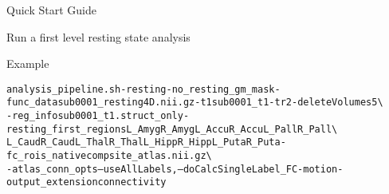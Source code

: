 \documentclass[]{report}
\begin{document}
\begin{chapter}{Quick Start Guide }
\begin{section}{Run a first level resting state analysis}
\begin{description}
\end{description}



\begin{subsubsection}{Example}
\begin{alltt}
analysis\_pipeline.sh -resting -no_resting_gm_mask -func\_data sub0001\_resting4D.nii.gz -t1 sub0001_t1  -tr 2 -deleteVolumes 5 \textbackslash  \\
\hspace*{0.5in} -reg_info sub0001\_t1.struct_only -resting_first_regions L\_Amyg R\_Amyg L\_Accu R\_Accu L\_Pall R\_Pall \textbackslash  \\
\hspace*{0.5in} L\_Caud R\_Caud L\_Thal R\_Thal L\_Hipp R\_Hipp L\_Puta R\_Puta -fc\_rois\_native compsite_atlas.nii.gz  \textbackslash  \\
\hspace*{0.5in} -atlas_conn_opts --useAllLabels,--doCalcSingleLabel\_FC  -motion -output_extension connectivity
\end{alltt}
\end{subsubsection}

\end{section}


\end{chapter}
\end{document}
